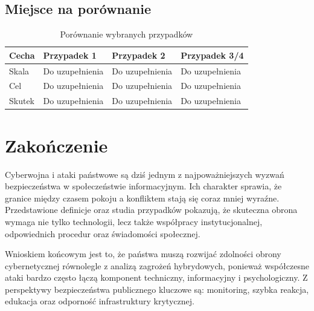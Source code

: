 \documentclass[12pt,a4paper]{article}
\begin{document}
\subsection{Miejsce na porównanie}
\begin{table}[H]
    \centering
    \caption{Porównanie wybranych przypadków}
    \begin{tabular}{p{3.5cm}p{3.5cm}p{3.5cm}p{3.5cm}}
        \toprule
        Cecha & Przypadek 1 & Przypadek 2 & Przypadek 3/4 \\
        \midrule
        Skala & Do uzupełnienia & Do uzupełnienia & Do uzupełnienia \\
        Cel & Do uzupełnienia & Do uzupełnienia & Do uzupełnienia \\
        Skutek & Do uzupełnienia & Do uzupełnienia & Do uzupełnienia \\
        \bottomrule
    \end{tabular}
\end{table}

\section{Zakończenie}
Cyberwojna i ataki państwowe są dziś jednym z najpoważniejszych wyzwań bezpieczeństwa w społeczeństwie informacyjnym. Ich charakter sprawia, że granice między czasem pokoju a konfliktem stają się coraz mniej wyraźne. Przedstawione definicje oraz studia przypadków pokazują, że skuteczna obrona wymaga nie tylko technologii, lecz także współpracy instytucjonalnej, odpowiednich procedur oraz świadomości społecznej.

Wnioskiem końcowym jest to, że państwa muszą rozwijać zdolności obrony cybernetycznej równolegle z analizą zagrożeń hybrydowych, ponieważ współczesne ataki bardzo często łączą komponent techniczny, informacyjny i psychologiczny. Z perspektywy bezpieczeństwa publicznego kluczowe są: monitoring, szybka reakcja, edukacja oraz odporność infrastruktury krytycznej.

\printbibliography[title={Bibliografia}]
\end{document}
